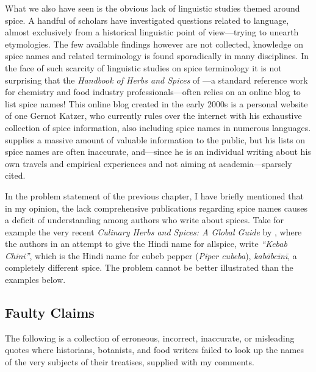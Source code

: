 What we also have seen is the obvious lack of linguistic studies themed around spice. A handful of scholars have investigated questions related to language, almost exclusively from a historical linguistic point of view---trying to unearth etymologies. The few available findings however are not collected, knowledge on spice names and related terminology is found sporadically in many disciplines. In the face of such scarcity of linguistic studies on spice terminology it is not surprising that the \textit{Handbook of Herbs and Spices} of \textcite{peter_handbook_2012}---a standard reference work for chemistry and food industry professionals---often relies on an online blog to list spice names! This online blog created in the early 2000s is a personal website of one Gernot Katzer, who currently rules over the internet with his exhaustive collection of spice information, also including spice names in numerous languages. \textcite{katzer_gernot_2006} supplies a massive amount of valuable information to the public, but his lists on spice names are often inaccurate, and---since he is an individual writing about his own travels and empirical experiences and not aiming at academia---sparsely cited.

In the problem statement of the previous chapter, I have briefly mentioned that in my opinion, the lack comprehensive publications regarding spice names causes a deficit of understanding among authors who write about spices. Take for example the very recent \textit{Culinary Herbs and Spices: A Global Guide} by \textcite[11]{opara_culinary_2021}, where the authors in an attempt to give the Hindi name for allspice, write \textit{``Kebab Chini''}, which is the Hindi name for cubeb pepper (\textit{Piper cubeba}),  \textit{kabābcīnī}, a completely different spice. The problem cannot be better illustrated than the examples below.

\subsection{Faulty Claims}

The following is a collection of erroneous, incorrect, inaccurate, or misleading quotes where historians, botanists, and food writers failed to look up the names of the very subjects of their treatises, supplied with my comments.

